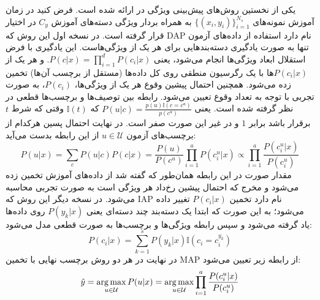  
یکی از نخستین روش‌های پیش‌بینی ویژگی در \cite{lampert09} ارائه شده است. فرض کنید در زمان آموزش نمونه‌های 
$ \{ (x_i, y_i) \}_{i=1}^{N_s} $ 
به همراه بردار ویژگی دسته‌های آموزش  $C_y$ در اختیار قرار گرفته است. در نسخه اول این روش که DAP
 نام دارد استفاده از داده‌های آزمون تنها به صورت یادگیری دسته‌بندهایی برای هر یک از ویژگی‌هاست. این یادگیری با فرض استقلال ابعاد ویژگی‌ها انجام می‌شود، یعنی 
$P(c|x) = \prod_{i=1}^d P(c_i|x) $.
و هر یک از $P(c_i|x) $ها با یک رگرسیون منطقی 
روی کل داده‌ها (مستقل از برچسب آن‌ها) تخمین زده می‌شود. همچنین احتمال پیشین وقوع هر یک از ویژگی‌ها، $ P(c_i)$، به صورت تجربی
 با توجه به تعداد وقوع تعیین می‌شود. رابطه بین توصیف‌ها و برچسب‌ها قطعی در نظر گرفته شده است. یعنی 
 $P(u|c) = \frac{p(u)\mathbb{I}(c = c^u) }{p(c^u)}$
 که $ \mathbb{I}(t) $ وقتی که شرط $t$ برقرار باشد برابر $1$ و در غیر این صورت صفر است. 
  در نهایت احتمال پسین هرکدام از برچسب‌های آزمون $u \in \mathcal{U}$ از این رابطه بدست می‌آید:
\begin{equation}
P(u | x ) = \sum_{c} P(u | c)P(c|x) = \frac{P(u)}{P(c^u)} \prod_{i=1}^a P(c^u_i|x) \propto \prod_{i=1}^a \frac{P(c^u_i|x)}{P(c^u_i)}
\end{equation}
مقدار صورت در این رابطه همان‌طور که گفته شد از داده‌های آموزش تخمین زده می‌شود و مخرج که احتمال پیشین رخ‌داد هر ویژگی است به صورت تجربی محاسبه می‌شود.
در نسخه دیگر این روش که IAP
 نام دارد تخمین  $P(c_i|x) $ تغییر داده می‌شود؛ به این صورت که ابتدا یک دسته‌بند چند دسته‌ای یعنی $P(y_k |x)$ روی داده‌ها یاد گرفته می‌شود و سپس رابطه ویژگی‌ها و برچسب‌ها به صورت قطعی مدل می‌شود:
\begin{equation}
P(c_i | x) = \sum_{k=1}^s P(y_k | x) \mathbb{I}(c_i = c^{y_k}_i)
\end{equation}
در نهایت در هر دو روش برچسب نهایی با تخمین MAP 
از رابطه زیر تعیین می‌شود:
\begin{equation}
\hat{y} = \operatorname*{arg\,max}_{u \in \mathcal{U}} P(u|x) =  \operatorname*{arg\,max}_{u \in \mathcal{U}} \prod_{i=1}^a \frac{P(c_i^u | x)}{P(c_i^u)}
\end{equation}


